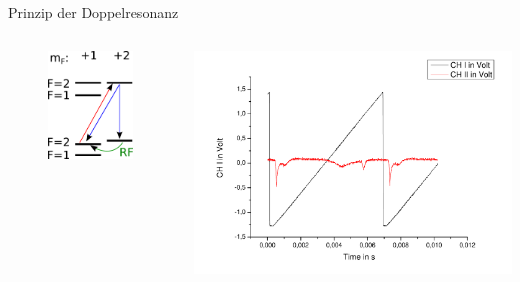 \documentclass{beamer}
\begin{document}
\begin{frame}{Prinzip der Doppelresonanz}
\begin{columns}
\begin{column}{3.5cm}
	\begin{figure}[H]
	\centering \includegraphics[width=\textwidth]{Bilder/OPRF.pdf}
	\end{figure}
\end{column}
\begin{column}{6.5cm}
\pause \centering \includegraphics[width=1.1\textwidth]{Bilder/DR_SZ.pdf}
\end{column}
\end{columns}
\end{frame}
\end{document}
